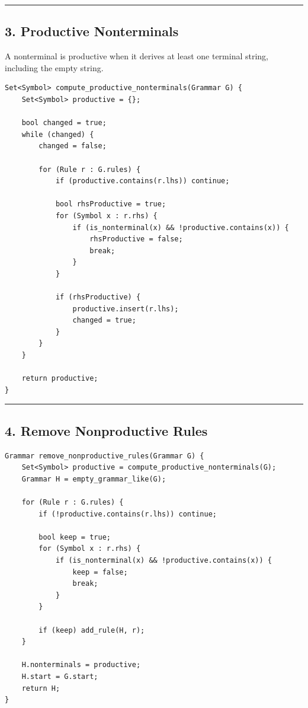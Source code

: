 \documentclass[10pt,letterpaper]{article}
\begin{document}
\medskip\hrule\medskip

\subsection*{3. Productive Nonterminals}

A nonterminal is productive when it derives at least one terminal string, including the empty string.

\begin{verbatim}
Set<Symbol> compute_productive_nonterminals(Grammar G) {
    Set<Symbol> productive = {};

    bool changed = true;
    while (changed) {
        changed = false;

        for (Rule r : G.rules) {
            if (productive.contains(r.lhs)) continue;

            bool rhsProductive = true;
            for (Symbol x : r.rhs) {
                if (is_nonterminal(x) && !productive.contains(x)) {
                    rhsProductive = false;
                    break;
                }
            }

            if (rhsProductive) {
                productive.insert(r.lhs);
                changed = true;
            }
        }
    }

    return productive;
}
\end{verbatim}

\medskip\hrule\medskip

\subsection*{4. Remove Nonproductive Rules}

\begin{verbatim}
Grammar remove_nonproductive_rules(Grammar G) {
    Set<Symbol> productive = compute_productive_nonterminals(G);
    Grammar H = empty_grammar_like(G);

    for (Rule r : G.rules) {
        if (!productive.contains(r.lhs)) continue;

        bool keep = true;
        for (Symbol x : r.rhs) {
            if (is_nonterminal(x) && !productive.contains(x)) {
                keep = false;
                break;
            }
        }

        if (keep) add_rule(H, r);
    }

    H.nonterminals = productive;
    H.start = G.start;
    return H;
}
\end{verbatim}
\end{document}
